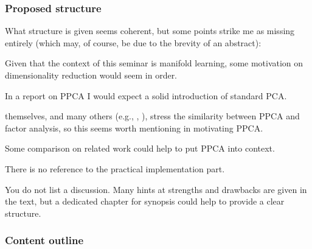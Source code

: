 \documentclass[12pt]{article}
\newenvironment{tight_itemize}{
\begin{itemize}
  \setlength{\itemsep}{0pt}
  \setlength{\parskip}{0pt}
}{\end{itemize}}
\begin{document}
\subsubsection*{Proposed structure}
What structure is given seems coherent, but some points strike me as missing 
entirely (which may, of course, be due to the brevity of an abstract):

\begin{tight_itemize}
  \item Given that the context of this seminar is manifold learning, some 
  motivation on dimensionality reduction would seem in order. 
  \item In a report on PPCA I would expect a solid introduction of 
  standard PCA.
  \item \citet{tippingbishop1999} themselves, and many others (e.g., 
  \citet{burges2004}, \citet{bouveyronetal2011}), stress the similarity between 
  PPCA and factor analysis, so this seems worth mentioning in motivating PPCA.
  \item Some comparison on related work could help to put PPCA into context.
  \item There is no reference to the practical implementation part.
  \item You do not list a discussion.
  Many hints at strengths and drawbacks are given in the text, but a dedicated 
  chapter for synopsis could help to provide a clear structure.
\end{tight_itemize}

\subsubsection*{Content outline}
\end{document}

